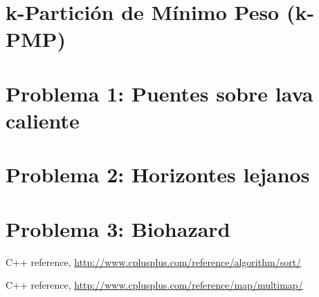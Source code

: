 \documentclass[11pt,a4paper]{article}
\begin{document}
\thispagestyle{empty}
\maketitle
\tableofcontents

\newpage
\section{k-Partici\'on de M\'inimo Peso (k-PMP)}


\newpage
\section{Problema 1: Puentes sobre lava caliente}


\newpage
\section{Problema 2: Horizontes lejanos}


\newpage
\section{Problema 3: Biohazard}


\newpage
\begin{thebibliography}{2}

  C++ reference,
  \url{http://www.cplusplus.com/reference/algorithm/sort/}
 

	C++ reference,
	\url{http://www.cplusplus.com/reference/map/multimap/}
  
\end{thebibliography}
\end{document}
